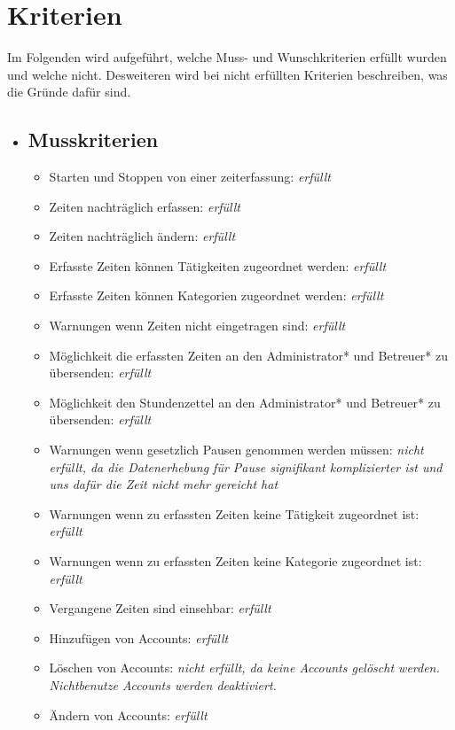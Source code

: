 \section{Kriterien}
Im Folgenden wird aufgeführt, welche Muss- und Wunschkriterien erfüllt wurden und welche nicht. Desweiteren wird bei nicht erfüllten Kriterien beschreiben, was die Gründe dafür sind.

    \begin{itemize}
    \item \subsection{Musskriterien}
    \begin{itemize}
      \item Starten und Stoppen von einer zeiterfassung: \emph{erfüllt}
      \item Zeiten nachträglich erfassen: \emph{erfüllt} 
      \item Zeiten nachträglich ändern: \emph{erfüllt}
      \item Erfasste Zeiten können Tätigkeiten zugeordnet werden: \emph{erfüllt}
      \item Erfasste Zeiten können Kategorien zugeordnet werden: \emph{erfüllt}
      \item Warnungen wenn Zeiten nicht eingetragen sind: \emph{erfüllt}
      \item Möglichkeit die erfassten Zeiten an den Administrator* und Betreuer* zu übersenden: \emph{erfüllt}
	    \item Möglichkeit den Stundenzettel an den Administrator* und Betreuer* zu übersenden: \emph{erfüllt}
	    \item Warnungen wenn gesetzlich Pausen genommen werden müssen: \emph{nicht erfüllt, da die Datenerhebung für Pause signifikant komplizierter ist und uns dafür die Zeit nicht mehr gereicht hat}
	    \item Warnungen wenn zu erfassten Zeiten keine Tätigkeit zugeordnet ist: \emph{erfüllt}
	    \item Warnungen wenn zu erfassten Zeiten keine Kategorie zugeordnet ist: \emph{erfüllt}
	    \item Vergangene Zeiten sind einsehbar: \emph{erfüllt}
    	\item Hinzufügen von Accounts: \emph{erfüllt}
    	\item Löschen von Accounts: \emph{nicht erfüllt, da keine Accounts gelöscht werden. Nichtbenutze Accounts werden deaktiviert.}
    	\item Ändern von Accounts: \emph{erfüllt}

\end{itemize}
\end{itemize}
